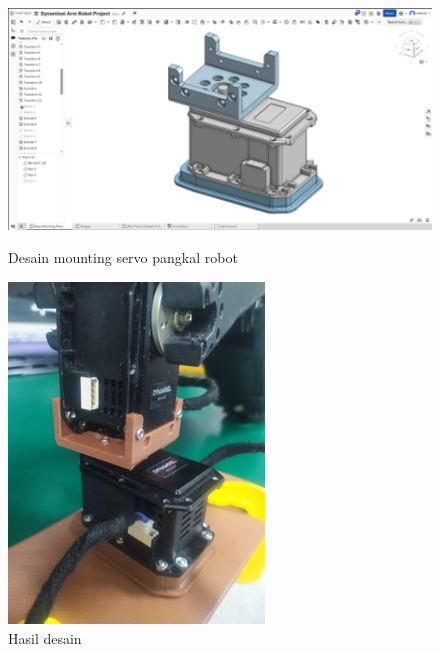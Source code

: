 \begin{figure}[h]
    \centering
    \begin{minipage}{0.60\columnwidth}
        \centering
        \includegraphics[width=\linewidth]{gambar/desain mounting servo.png}
        \caption{Desain mounting servo pangkal robot}
        \label{fig:servo_mounting}
    \end{minipage}
    \hfill
    \begin{minipage}{0.24\columnwidth}
        \centering
        \includegraphics[width=\linewidth]{gambar/hasil desain mounting servo.jpg}
        \caption{Hasil desain}
        \label{fig:hasil_servo_mounting}
    \end{minipage}
\end{figure}

